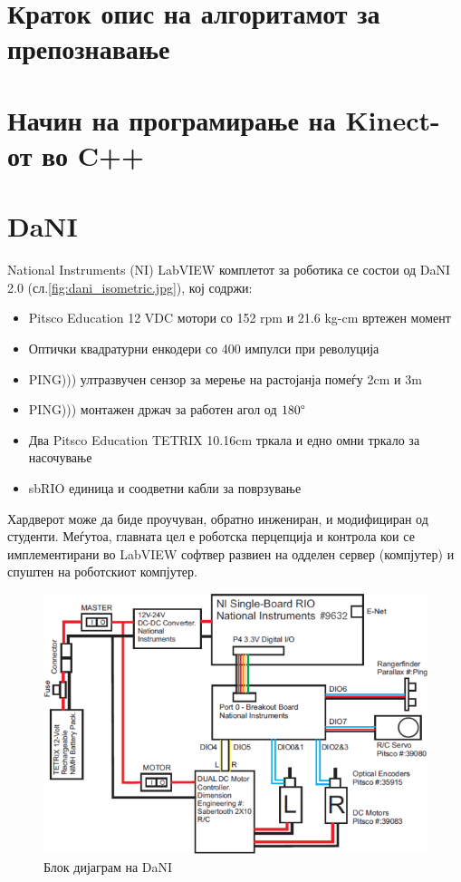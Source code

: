 \documentclass{article}
\begin{document}
  
\newpage
\section{Краток опис на алгоритамот за препознавање}
\newpage
\section{Начин на програмирање на Kinect-от во C++}
\newpage
\section{DaNI}
National Instruments (NI) LabVIEW комплетот за роботика се состои од DaNI 2.0 (сл.\ref{fig:dani_isometric.jpg}), кој содржи:

\begin{itemize}
	\item Pitsco Education 12 VDC мотори со 152 rpm и 21.6 kg-cm вртежен момент
	\item Оптички квадратурни енкодери со 400 импулси при револуција
	\item PING))) ултразвучен сензор за мерење на растојанја помеѓу 2cm и 3m
	\item PING))) монтажен држач за работен агол од $180 \degree$
	\item Два Pitsco Education TETRIX 10.16cm тркала и едно омни тркало за насочување
	\item sbRIO единица и соодветни кабли за поврзување
\end{itemize}

Хардверот може да биде проучуван, обратно инжениран, и модифициран од студенти. Меѓутоа, главната цел е роботска перцепција и контрола кои се имплементирани во LabVIEW софтвер развиен на одделен сервер (компјутер) и спуштен на роботскиот компјутер.

\begin{figure}[H]
\includegraphics[width=0.75\linewidth]{dani_block_diagram.png}
\centering
\caption{Блок дијаграм на DaNI}
\label{fig:dani_block_diagram.png}
\end{figure}
\end{document}
